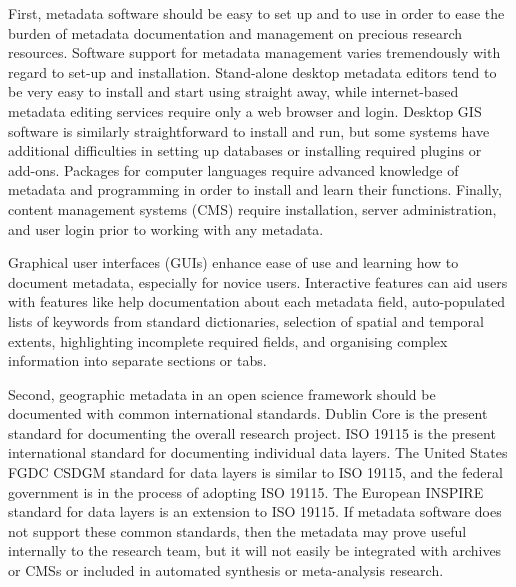 \documentclass{isprs} %
\begin{document}
First, metadata software should be easy to set up and to use in order to ease the burden of metadata documentation and management on precious research resources.
Software support for metadata management varies tremendously with regard to set-up and installation.
Stand-alone desktop metadata editors tend to be very easy to install and start using straight away, while internet-based metadata editing services require only a web browser and login.
Desktop GIS software is similarly straightforward to install and run, but some systems have additional difficulties in setting up databases or installing required plugins or add-ons.
Packages for computer languages require advanced knowledge of metadata and programming in order to install and learn their functions.
Finally, content management systems (CMS) require installation, server administration, and user login prior to working with any metadata. 

Graphical user interfaces (GUIs) enhance ease of use and learning how to document metadata, especially for novice users.
Interactive features can aid users with features like help documentation about each metadata field, auto-populated lists of keywords from standard dictionaries, selection of spatial and temporal extents, highlighting incomplete required fields, and organising complex information into separate sections or tabs.

Second, geographic metadata in an open science framework should be documented with common international standards. 
Dublin Core is the present standard for documenting the overall research project. 
ISO 19115 is the present international standard for documenting individual data layers.
The United States FGDC CSDGM standard for data layers is similar to ISO 19115, and the federal government is in the process of adopting ISO 19115.
The European INSPIRE standard for data layers is an extension to ISO 19115. 
If metadata software does not support these common standards, then the metadata may prove useful internally to the research team, but it will not easily be integrated with archives or CMSs or included in automated synthesis or meta-analysis research.
\end{document}
